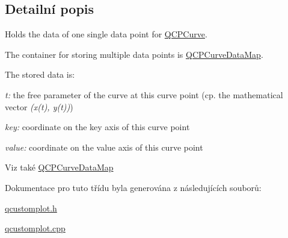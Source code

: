 \subsection{Detailní popis}
Holds the data of one single data point for \hyperlink{classQCPCurve}{Q\+C\+P\+Curve}. 

The container for storing multiple data points is \hyperlink{qcustomplot_8h_a444d37ec9cb2951b3a7fe443c34d1658}{Q\+C\+P\+Curve\+Data\+Map}.

The stored data is\+: \begin{DoxyItemize}
\item {\itshape t\+:} the free parameter of the curve at this curve point (cp. the mathematical vector {\itshape (x(t), y(t))}) \item {\itshape key\+:} coordinate on the key axis of this curve point \item {\itshape value\+:} coordinate on the value axis of this curve point\end{DoxyItemize}
\begin{DoxySeeAlso}{Viz také}
\hyperlink{qcustomplot_8h_a444d37ec9cb2951b3a7fe443c34d1658}{Q\+C\+P\+Curve\+Data\+Map} 
\end{DoxySeeAlso}


Dokumentace pro tuto třídu byla generována z následujících souborů\+:\begin{DoxyCompactItemize}
\item 
\hyperlink{qcustomplot_8h}{qcustomplot.\+h}\item 
\hyperlink{qcustomplot_8cpp}{qcustomplot.\+cpp}\end{DoxyCompactItemize}
